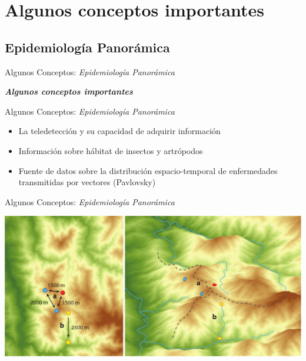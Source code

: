 \documentclass[10pt]{beamer}
\newcommand\IncrFont{\fontsize{20}{20}\selectfont}
\begin{document}
\section{Algunos conceptos importantes}


\subsection{Epidemiología Panorámica}

\begin{frame}{Algunos Conceptos: \textit{Epidemiología Panorámica}}
\IncrFont
  \begin{center}
    \textit{\textbf{Algunos conceptos importantes}}
  \end{center}

\end{frame}


\begin{frame}{Algunos Conceptos: \textit{Epidemiología Panorámica}}
  \pause
  \begin{itemize}[<+->]
   \item La teledetección y su capacidad de adquirir información
   \item Información sobre hábitat de insectos y artrópodos
   \item Fuente de datos sobre la distribución espacio-temporal de enfermedades
         transmitidas por vectores (Pavlovsky)
  \end{itemize}

\end{frame}


\begin{frame}{Algunos Conceptos: \textit{Epidemiología Panorámica}}
  \begin{center}
    \includegraphics[width=1\textwidth]{paisajes_heterogeneos}
  \end{center}
\end{frame}
\end{document}

